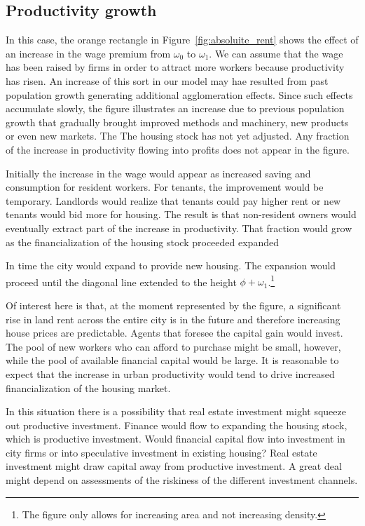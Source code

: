 \subsection {Productivity growth}
In this case, the orange rectangle in Figure~\ref{fig:absoluite_rent} shows the effect of an increase in the wage premium from $\omega_0$ to $\omega_1$. We can assume that the wage has been raised by firms in order to attract more workers because productivity has risen. An increase of this sort in our model may hae resulted  from past population growth generating additional agglomeration effects. Since such effects accumulate slowly, the figure illustrates an increase due to previous population growth that gradually brought improved methods and machinery, new products or even new markets. The    
The housing stock has not yet adjusted.  Any fraction of the increase in productivity  flowing into profits does not appear in the figure. 


Initially the increase in the wage would appear as increased saving and consumption for resident workers. For tenants, the improvement would be temporary. Landlords would realize that tenants could pay higher rent or new tenants would bid more for housing. The result is that non-resident owners would eventually extract part of  the increase in productivity. That fraction would grow as the financialization of the housing stock proceeded expanded 

In time the city would expand to provide new housing. The expansion would proceed until the diagonal line extended to the height $\phi+\omega_1$.\footnote{The figure only allows for increasing area and not increasing density.}  

Of interest here is that, at the moment represented by the figure, a significant rise in land rent across the entire city is in the future and therefore increasing house prices are predictable. Agents that foresee the capital gain would invest. The pool of new workers who can afford to purchase might be small, however, while the pool of available financial capital would be large. It is reasonable to expect that the increase in urban productivity would tend to drive increased financialization of the housing market.

In this situation there is a possibility that real estate investment might squeeze out productive investment. Finance would flow to expanding the housing stock, which is productive investment.  Would financial capital flow into investment in city firms or into speculative investment in existing housing? Real estate investment might  draw capital away from productive investment. A great deal might depend on assessments of the riskiness of the different investment channels.


